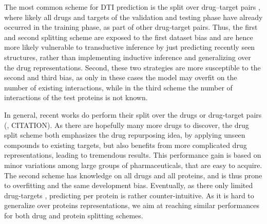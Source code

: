 \documentclass{bioinfo}
\renewcommand{\cite}{\citep}
\begin{document}
The most common scheme for DTI prediction is the split over
drug--target pairs \citep{Survey2018}, where likely all drugs and
targets of the validation and testing phase have already occurred in
the training phase, as part of other drug-target pairs. Thus, the
first and second splitting scheme are exposed to the first dataset
bias and are hence more likely vulnerable to transductive inference by
just predicting recently seen structures, rather than implementing
inductive inference and generalizing over the drug
representations. Second, these two strategies are more susceptible to
the second and third bias, as only in these cases the model may
overfit on the number of existing interactions, while in the third
scheme the number of interactions of the test proteins is not known.



In general, recent works do perform their split over the drugs or drug-target pairs (\cite{Survey2018}, CITATION). As there are hopefully many more drugs to discover, the drug split scheme both emphasizes the drug repurposing idea, by applying unseen compounds to existing targets, but also benefits from more complicated drug representations, leading to tremendous results. This performance gain is based on minor variations among large groups of pharmaceuticals, that are easy to acquire. The second scheme has knowledge on all drugs and all proteins, and is thus prone to overfitting and the same development bias. Eventually, as there only limited drug-targets \citep{Overington2006}, predicting per protein is rather counter-intuitive. As it is hard to generalize over proteins representations, we aim at reaching similar performances for both drug and protein splitting schemes. \\
\end{document}
